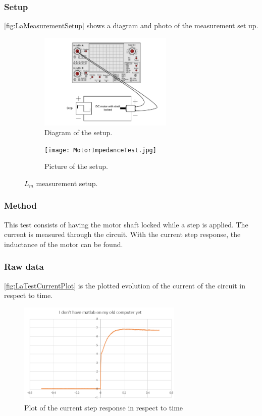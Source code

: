 \subsubsection*{Setup}
\autoref{fig:LaMeasurementSetup} shows a diagram and photo of the measurement set up.
\begin{figure}[htbp]
	\centering
	\begin{subfigure}{0.50\textwidth}
		\includegraphics[width=0.7\textwidth]{figures/appendix/Motor&GearTests/LmDiagram}
		\caption{Diagram of the setup.} \label{fig:LaMeasurementDiagram}
	\end{subfigure}
	\begin{subfigure}{0.40\textwidth}
		\texttt{[image: MotorImpedanceTest.jpg]}
		\caption{Picture of the setup.} \label{fig:LaMeasurementPictures}
	\end{subfigure}
	\caption{$L_m$ measurement setup.} \label{fig:LaMeasurementSetup}   
\end{figure}

\subsubsection*{Method}
This test consists of having the motor shaft locked while a step is applied. The current is measured through the circuit. With the current step response, the inductance of the motor can be found. 
\subsubsection*{Raw data}
\autoref{fig:LaTestCurrentPlot} is the plotted evolution of the current of the circuit in respect to time.

\begin{figure}[htbp]
	\centering
	\includegraphics[width=0.7\textwidth]{figures/appendix/Motor&GearTests/LmLamePlot}
	\caption{Plot of the current step response in respect to time}\label{fig:LaTestCurrentPlot}
\end{figure}


